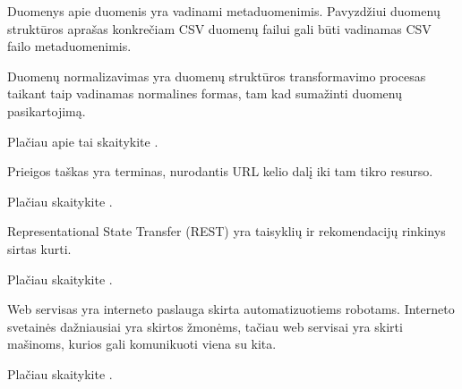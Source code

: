 \documentclass[letterpaper,10pt,lithuanian]{sphinxmanual}
\begin{document}
\begin{description}
\sphinxAtStartPar
Duomenys apie duomenis yra vadinami metaduomenimis. Pavyzdžiui duomenų
struktūros aprašas konkrečiam CSV duomenų failui gali būti vadinamas CSV
failo metaduomenimis.

\sphinxAtStartPar
Duomenų normalizavimas yra duomenų struktūros transformavimo procesas
taikant taip vadinamas normalines formas, tam kad sumažinti duomenų
pasikartojimą.

\sphinxAtStartPar
Plačiau apie tai skaitykite .

\sphinxAtStartPar
Prieigos taškas yra {\hyperref[\detokenize{savokos:term-REST-API}]{}} terminas, nurodantis URL kelio dalį iki tam
tikro resurso.

\sphinxAtStartPar
Plačiau skaitykite .

\sphinxAtStartPar
Representational State Transfer (REST) yra taisyklių ir rekomendacijų
rinkinys sirtas {\hyperref[\detokenize{savokos:term-web-servisas}]{}} kurti.

\sphinxAtStartPar
Plačiau skaitykite .

\sphinxAtStartPar
Web servisas yra interneto paslauga skirta automatizuotiems robotams.
Interneto svetainės dažniausiai yra skirtos žmonėms, tačiau web servisai
yra skirti mašinoms, kurios gali komunikuoti viena su kita.

\sphinxAtStartPar
Plačiau skaitykite .


\end{description}
\end{document}
